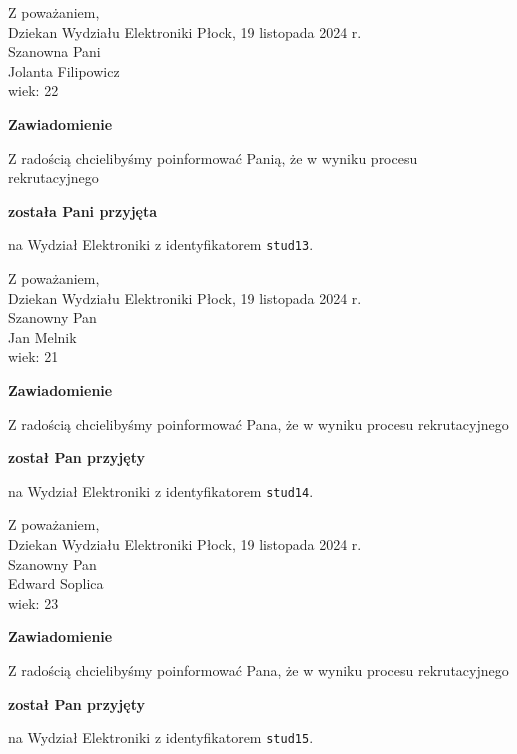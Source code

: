 \documentclass[12pt,a4paper]{article}
\begin{document}
\noindent
Z poważaniem,\\
Dziekan
Wydziału Elektroniki
\newpage
\hfill Płock, 19 listopada 2024 r.\\ 
\noindent 
Szanowna Pani \\
Jolanta Filipowicz \\
wiek: 22

\bigskip

\begin{center}
{\Large\textbf{Zawiadomienie}}
\end{center}
\bigskip
Z radością chcielibyśmy poinformować Panią, że w wyniku procesu rekrutacyjnego
\begin{center}
\textsf{\textbf{została Pani przyjęta}} 
\end{center}
na Wydział Elektroniki z identyfikatorem \verb|stud13|.
\vspace{2cm}

\noindent
Z poważaniem,\\
Dziekan
Wydziału Elektroniki
\newpage
\hfill Płock, 19 listopada 2024 r.\\ 
\noindent 
Szanowny Pan \\
Jan Melnik \\
wiek: 21

\bigskip

\begin{center}
{\Large\textbf{Zawiadomienie}}
\end{center}
\bigskip
Z radością chcielibyśmy poinformować Pana, że w wyniku procesu rekrutacyjnego
\begin{center}
\textsf{\textbf{został Pan przyjęty}} 
\end{center}
na Wydział Elektroniki z identyfikatorem \verb|stud14|.
\vspace{2cm}

\noindent
Z poważaniem,\\
Dziekan
Wydziału Elektroniki
\newpage
\hfill Płock, 19 listopada 2024 r.\\ 
\noindent 
Szanowny Pan \\
Edward Soplica \\
wiek: 23

\bigskip

\begin{center}
{\Large\textbf{Zawiadomienie}}
\end{center}
\bigskip
Z radością chcielibyśmy poinformować Pana, że w wyniku procesu rekrutacyjnego
\begin{center}
\textsf{\textbf{został Pan przyjęty}} 
\end{center}
na Wydział Elektroniki z identyfikatorem \verb|stud15|.
\vspace{2cm}
\end{document}
